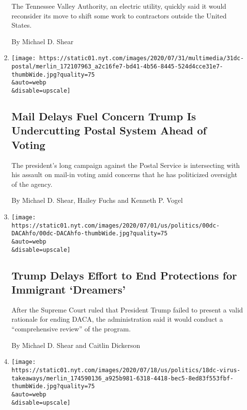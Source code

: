 \begin{enumerate}
  The Tennessee Valley Authority, an electric utility, quickly said it
  would reconsider its move to shift some work to contractors outside
  the United States.

  By Michael D. Shear
\item
  \href{/2020/07/31/us/politics/trump-usps-mail-delays.html}{}

  \texttt{[image: https://static01.nyt.com/images/2020/07/31/multimedia/31dc-postal/merlin\_172107963\_a2c16fe7-bd41-4b56-8445-524d4cce31e7-thumbWide.jpg?quality=75\\\&auto=webp\\\&disable=upscale]}

  \hypertarget{mail-delays-fuel-concern-trump-is-undercutting-postal-system-ahead-of-voting}{%
  \subsection{Mail Delays Fuel Concern Trump Is Undercutting Postal
  System Ahead of
  Voting}\label{mail-delays-fuel-concern-trump-is-undercutting-postal-system-ahead-of-voting}}

  The president's long campaign against the Postal Service is
  intersecting with his assault on mail-in voting amid concerns that he
  has politicized oversight of the agency.

  By Michael D. Shear, Hailey Fuchs and Kenneth P. Vogel
\item
  \href{/2020/07/28/us/politics/trump-daca.html}{}

  \texttt{[image: https://static01.nyt.com/images/2020/07/01/us/politics/00dc-DACAhfo/00dc-DACAhfo-thumbWide.jpg?quality=75\\\&auto=webp\\\&disable=upscale]}

  \hypertarget{trump-delays-effort-to-end-protections-for-immigrant-dreamers}{%
  \subsection{Trump Delays Effort to End Protections for Immigrant
  `Dreamers'}\label{trump-delays-effort-to-end-protections-for-immigrant-dreamers}}

  After the Supreme Court ruled that President Trump failed to present a
  valid rationale for ending DACA, the administration said it would
  conduct a ``comprehensive review'' of the program.

  By Michael D. Shear and Caitlin Dickerson
\item
  \href{/2020/07/18/us/politics/trump-coronavirus-failure-takeaways.html}{}

  \texttt{[image: https://static01.nyt.com/images/2020/07/18/us/politics/18dc-virus-takeaways/merlin\_174590136\_a925b981-6318-4418-bec5-8ed83f553fbf-thumbWide.jpg?quality=75\\\&auto=webp\\\&disable=upscale]}


\end{enumerate}
